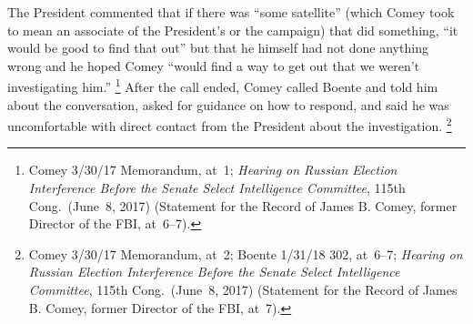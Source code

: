 The President commented that if there was ``some satellite'' (which Comey took to mean an associate of the President's or the campaign) that did something, ``it would be good to find that out'' but that he himself had not done anything wrong and he hoped Comey ``would find a way to get out that we weren't investigating him.''%
\footnote{Comey 3/30/17 Memorandum, at~1;
\textit{Hearing on Russian Election Interference Before the Senate Select Intelligence Committee}, 115th Cong.\ (June~8, 2017) (Statement for the Record of James B. Comey, former Director of the FBI, at~6--7).}
After the call ended, Comey called Boente and told him about the conversation, asked for guidance on how to respond, and said he was uncomfortable with direct contact from the President about the investigation.%
\footnote{Comey 3/30/17 Memorandum, at~2;
Boente 1/31/18 302, at~6--7;
\textit{Hearing on Russian Election Interference Before the Senate Select Intelligence Committee}, 115th Cong.\ (June~8, 2017) (Statement for the Record of James B. Comey, former Director of the FBI, at~7).}

